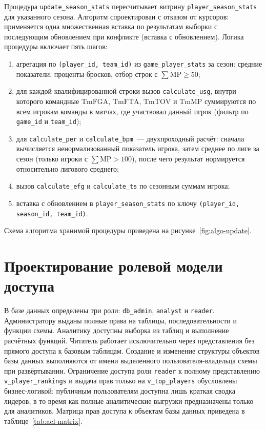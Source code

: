 Процедура \texttt{update\_season\_stats} пересчитывает витрину
\texttt{player\_season\_stats} для указанного сезона. Алгоритм спроектирован
с отказом от курсоров: применяется одна множественная вставка по результатам
выборки с последующим обновлением при конфликте (вставка с обновлением).
Логика процедуры включает
пять шагов:
\begin{enumerate}
    \item агрегация по \texttt{(player\_id, team\_id)} из \texttt{game\_player\_stats}
          за сезон: средние показатели, проценты бросков, отбор строк с
          $\sum \mathrm{MP} \geq 50$;
    \item для каждой квалифицированной строки вызов \texttt{calculate\_usg}, внутри
          которого командные $\mathrm{TmFGA}$, $\mathrm{TmFTA}$, $\mathrm{TmTOV}$
          и $\mathrm{TmMP}$ суммируются по всем игрокам команды в матчах, где
          участвовал данный игрок (фильтр по \texttt{game\_id} и \texttt{team\_id});
    \item для \texttt{calculate\_per} и \texttt{calculate\_bpm}~--- двухпроходный
          расчёт: сначала вычисляется ненормализованный показатель игрока, затем
          среднее по лиге за сезон (только игроки с $\sum \mathrm{MP} > 100$),
          после чего результат нормируется относительно лигового среднего;
    \item вызов \texttt{calculate\_efg} и \texttt{calculate\_ts} по сезонным
          суммам игрока;
    \item вставка с обновлением в \texttt{player\_season\_stats} по ключу
          \texttt{(player\_id, season\_id, team\_id)}.
\end{enumerate}

Схема алгоритма хранимой процедуры приведена на рисунке~\ref{fig:algo-update}.
\flowchartUpdateSeasonStats

\section{Проектирование ролевой модели доступа}\label{sec:roles}

В базе данных определены три роли: \texttt{db\_admin}, \texttt{analyst} и
\texttt{reader}. Администратору выданы полные права на таблицы,
последовательности и функции схемы. Аналитику доступны выборка из таблиц и
выполнение расчётных функций. Читатель работает исключительно через
представления без прямого доступа к базовым таблицам. Создание и изменение
структуры объектов базы данных выполняются от имени выделенного
пользователя-владельца схемы при развёртывании. Ограничение доступа роли
\texttt{reader} к полному представлению \texttt{v\_player\_rankings} и выдача прав
только на \texttt{v\_top\_players} обусловлены бизнес-логикой: публичным пользователям
доступна лишь краткая сводка лидеров, в то время как полные аналитические выгрузки
предназначены только для аналитиков.
Матрица прав доступа к объектам базы данных приведена в таблице~\ref{tab:acl-matrix}.

